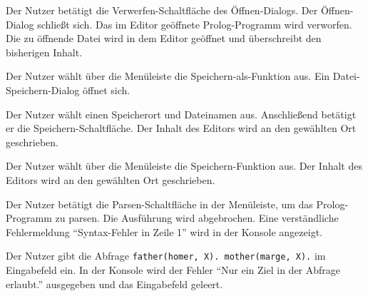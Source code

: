 \documentclass[parskip=full,11pt,twoside]{scrartcl}
\begin{document}
{Der Nutzer betätigt die Verwerfen-Schaltfläche des Öffnen-Dialogs.}
{Der Öffnen-Dialog schließt sich. Das im Editor geöffnete Prolog-Programm wird verworfen. Die zu öffnende Datei wird in dem Editor geöffnet und überschreibt den bisherigen Inhalt.}


{Der Nutzer wählt über die Menüleiste die Speichern-als-Funktion aus.}
{Ein Datei-Speichern-Dialog öffnet sich.}

{Der Nutzer wählt einen Speicherort und Dateinamen aus. Anschließend betätigt er die Speichern-Schaltfläche.}
{Der Inhalt des Editors wird an den gewählten Ort geschrieben.}


{Der Nutzer wählt über die Menüleiste die Speichern-Funktion aus.}
{Der Inhalt des Editors wird an den gewählten Ort geschrieben.}


{Der Nutzer betätigt die Parsen-Schaltfläche in der Menüleiste, um das Prolog-Programm zu parsen.}
{Die Ausführung wird abgebrochen. Eine verständliche Fehlermeldung \enquote{Syntax-Fehler in Zeile 1} wird in der Konsole angezeigt.}


{Der Nutzer gibt die Abfrage \texttt{father(homer, X). mother(marge, X).} im Eingabefeld ein.}
{In der Konsole wird der Fehler \enquote{Nur ein Ziel in der Abfrage erlaubt.} ausgegeben und das Eingabefeld geleert.}

\end{document}
